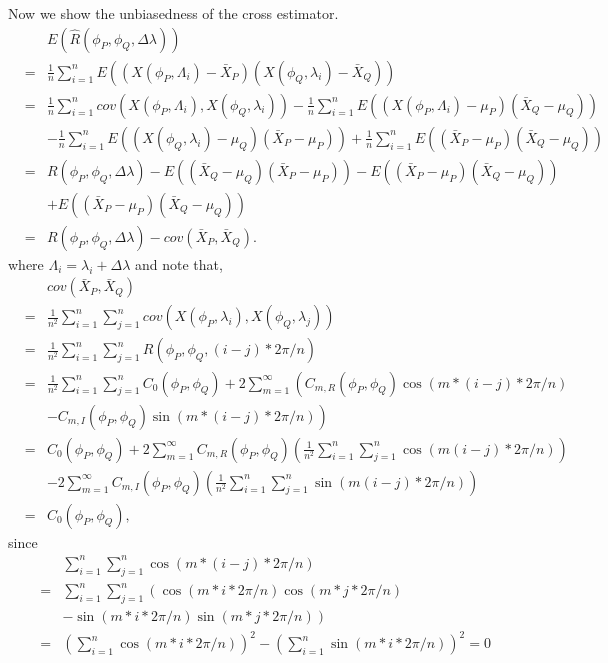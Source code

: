 Now we show the unbiasedness of the cross \cov estimator.	
\begin{eqnarray*}
				& & E(\hat{R}(\phi_P, \phi_Q, \Delta \lambda)) \\
				&=& \frac{1}{n}\sum_{i = 1}^n E((X(\phi_P, \Lambda_i) - \bar{X}_P)(X(\phi_Q, \lambda_i) - \bar{X}_Q)) \\
				&=& \frac{1}{n}\sum_{i=1}^n cov(X(\phi_P, \Lambda_i), X(\phi_Q, \lambda_i)) - \frac{1}{n}\sum_{i = 1}^n E((X(\phi_P, \Lambda_i) - \mu_P)(\bar{X}_Q - \mu_Q)) \\
				& & -\frac{1}{n}\sum_{i = 1}^n E((X(\phi_Q, \lambda_i) - \mu_Q)(\bar{X}_P - \mu_P)) + \frac{1}{n}\sum_{i = 1}^n E((\bar{X}_P - \mu_P)(\bar{X}_Q - \mu_Q)) \\
				&=& R(\phi_P, \phi_Q, \Delta \lambda) -E((\bar{X}_Q - \mu_Q)(\bar{X}_P - \mu_P)) - E((\bar{X}_P - \mu_P)(\bar{X}_Q - \mu_Q)) \\
				& & + E((\bar{X}_P - \mu_P)(\bar{X}_Q - \mu_Q)) \\
				&=& R(\phi_P, \phi_Q, \Delta \lambda) - cov(\bar{X}_P, \bar{X}_Q).
\end{eqnarray*}
where $\Lambda_i = \lambda_i + \Delta \lambda$ and note that,
\begin{eqnarray*}
				& & cov(\bar{X}_P, \bar{X}_Q) \\
				&=&  \frac{1}{n^2}\sum_{i = 1}^n \sum_{j=1}^n cov(X(\phi_P, \lambda_i), X(\phi_Q, \lambda_j)) \\
				&=& \frac{1}{n^2}\sum_{i = 1}^n \sum_{j=1}^n R(\phi_P, \phi_Q, (i-j)*2\pi/n) \\
				&=& \frac{1}{n^2}\sum_{i = 1}^n \sum_{j=1}^n  C_0(\phi_P, \phi_Q)  + 2\sum_{m=1}^\infty \left( C_{m, R}(\phi_P, \phi_Q) \cos(m*(i-j)*2\pi/n) \right. \\
				& & - \left. C_{m, I}(\phi_P, \phi_Q) \sin(m*(i-j)*2\pi/n) \right) \\
				&=& C_0(\phi_P, \phi_Q) + 2\sum_{m=1}^\infty C_{m, R}(\phi_P, \phi_Q) \left(\frac{1}{n^2}\sum_{i = 1}^n \sum_{j=1}^n \cos(m(i-j)*2\pi/n)\right) \\
				& & - 2\sum_{m=1}^\infty C_{m, I}(\phi_P, \phi_Q) \left(\frac{1}{n^2}\sum_{i = 1}^n \sum_{j=1}^n \sin(m(i-j)*2\pi/n)\right) \\
				&=& C_0(\phi_P, \phi_Q),
			\end{eqnarray*}			
since
			\begin{eqnarray*}
				& & \sum_{i = 1}^n \sum_{j=1}^n \cos(m*(i-j)*2\pi/n) \\
				&=& \sum_{i=1}^n \sum_{j=1}^n \left(\cos(m*i *2\pi/n)\cos(m*j*2\pi/n)\right. \\
				& & - \left.\sin(m*i *2\pi/n)\sin(m*j*2\pi/n) \right)\\
				&=& \left(\sum_{i=1}^n \cos(m*i *2\pi/n)\right)^2 - \left(\sum_{i=1}^n \sin(m*i *2\pi/n)\right)^2 = 0
			\end{eqnarray*}
